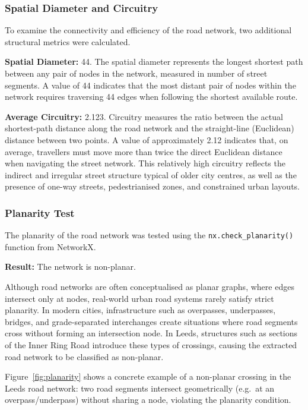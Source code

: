 \documentclass[conference]{IEEEtran}
\begin{document}
\subsubsection{Spatial Diameter and Circuitry}
To examine the connectivity and efficiency of the road network, two additional structural metrics were calculated.

\textbf{Spatial Diameter:} 44. The spatial diameter represents the longest shortest path between any pair of nodes in the network, measured in number of street segments. A value of 44 indicates that the most distant pair of nodes within the network requires traversing 44 edges when following the shortest available route.

\textbf{Average Circuitry:} 2.123. Circuitry\cite{topic6} measures the ratio between the actual shortest-path distance along the road network and the straight-line (Euclidean) distance between two points. A value of approximately 2.12 indicates that, on average, travellers must move more than twice the direct Euclidean distance when navigating the street network. This relatively high circuitry reflects the indirect and irregular street structure typical of older city centres, as well as the presence of one-way streets, pedestrianised zones, and constrained urban layouts.

\subsubsection{Planarity Test}
The planarity of the road network was tested using the \texttt{nx.check\_planarity()} function from NetworkX. 

\textbf{Result:} The network is non-planar. 

Although road networks are often conceptualised as planar graphs\cite{topic5}, where edges intersect only at nodes, real-world urban road systems rarely satisfy strict planarity. In modern cities, infrastructure such as overpasses, underpasses, bridges, and grade-separated interchanges create situations where road segments cross without forming an intersection node. In Leeds, structures such as sections of the Inner Ring Road introduce these types of crossings, causing the extracted road network to be classified as non-planar.

Figure~\ref{fig:planarity} shows a concrete example of a non-planar crossing in the Leeds road network: two road segments intersect geometrically (e.g.\ at an overpass/underpass) without sharing a node, violating the planarity condition.
\end{document}
